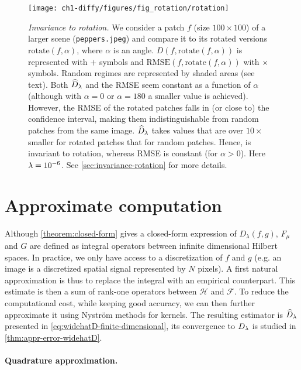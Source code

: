 \begin{figure}[t]
    \centering
    \texttt{[image: ch1-diffy/figures/fig\_rotation/rotation]}
    \caption{\emph{Invariance to rotation.} We consider a patch $f$ (size $100\times 100$) of a larger scene (\texttt{peppers.jpeg}) and compare it to its rotated versions $\text{rotate}(f, \alpha)$, where $\alpha$ is an angle. $D(f, \text{rotate}(f, \alpha))$ is represented with $+$ symbols and $\textrm{RMSE}(f, \text{rotate}(f, \alpha))$ with $\times$ symbols. Random regimes are represented by shaded areas (see text). Both $\widehat D_\lambda$ and the RMSE seem constant as a function of $\alpha$ (although with $\alpha=0$ or $\alpha=180$ a smaller value is achieved). However, the RMSE of the rotated patches falls in (or close to) the confidence interval, making them indistinguishable from random patches from the same image. $\widehat D_\lambda$ takes values that are over $10 \times$ smaller for rotated patches that for random patches. Hence, \Diffy is invariant to rotation, whereas RMSE is constant (for $\alpha > 0$). Here $\lambda = 10^{-6}$. See \cref{sec:invariance-rotation} for more details.}
    \label{fig:rotation}
\end{figure}

\section{Approximate computation}\label{sec:approximation}

Although \cref{theorem:closed-form} gives a closed-form expression of $D_\lambda(f,g)$, $F_\mu$ and $G$ are defined as integral operators between infinite dimensional Hilbert spaces. In practice, we only have access to a discretization of $f$ and $g$ (e.g. an image is a discretized spatial signal represented by $N$ pixels). A first natural approximation is thus to replace the integral with an empirical counterpart. This estimate is then a sum of rank-one operators between $\mathcal H$ and $\mathcal F$. To reduce the computational cost, while keeping good accuracy, we can then further approximate it using Nyström methods for kernels. The resulting estimator is $\widehat{D}_\lambda$ presented in \cref{eq:widehatD-finite-dimensional}, its convergence to $D_\lambda$ is studied in \cref{thm:appr-error-widehatD}.


\paragraph{Quadrature approximation.}

